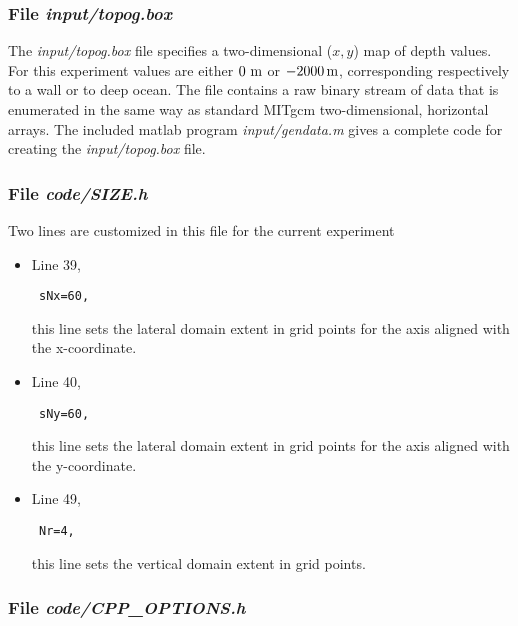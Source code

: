 \subsubsection{File {\it input/topog.box}}


The {\it input/topog.box} file specifies a two-dimensional ($x,y$) 
map of depth values. For this experiment values are either
$0~{\rm m}$ or $-2000\,{\rm m}$, corresponding respectively to a wall or to deep
ocean. The file contains a raw binary stream of data that is enumerated
in the same way as standard MITgcm two-dimensional, horizontal arrays.
The included matlab program {\it input/gendata.m} gives a complete
code for creating the {\it input/topog.box} file.

\subsubsection{File {\it code/SIZE.h}}

Two lines are customized in this file for the current experiment

\begin{itemize}

\item Line 39, 
\begin{verbatim} sNx=60, \end{verbatim} this line sets
the lateral domain extent in grid points for the
axis aligned with the x-coordinate.

\item Line 40, 
\begin{verbatim} sNy=60, \end{verbatim} this line sets
the lateral domain extent in grid points for the
axis aligned with the y-coordinate.

\item Line 49, 
\begin{verbatim} Nr=4,   \end{verbatim} this line sets
the vertical domain extent in grid points.

\end{itemize}

\begin{small}

\end{small}

\subsubsection{File {\it code/CPP\_OPTIONS.h}}

